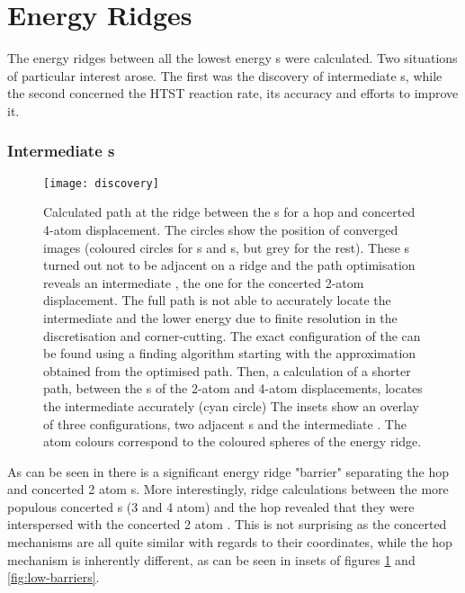 \section{Energy Ridges}
\label{al-energy-ridges}

The energy ridges between all the lowest energy s were calculated.
Two situations of particular interest arose.
The first was the discovery of intermediate s, while the second concerned the HTST reaction rate, its accuracy and efforts to improve it.

\subsubsection{Intermediate s}
\begin{figure}[hp]
\begin{center}
\texttt{[image: discovery]}
    \parbox{0.85\linewidth}{
\caption{
Calculated path at the ridge between the s for a hop and concerted 4-atom displacement.
The circles show the position of converged images (coloured circles for s and s, but grey for the rest). 
These s turned out not to be adjacent on a ridge and the path optimisation reveals an intermediate , the one for the concerted 2-atom displacement.
The full path is not able to accurately locate the intermediate  and the lower energy  due to finite resolution in the discretisation and corner-cutting.
The exact configuration of the  can be found using a  finding algorithm starting with the approximation obtained from the optimised path.
Then, a calculation of a shorter path, between the s of the 2-atom  and 4-atom displacements, locates the intermediate  accurately (cyan circle)
The insets show an overlay of three configurations, two adjacent s and the intermediate .
The atom colours correspond to the coloured spheres of the energy ridge.
}
\label{fig:discovery}
}
\end{center}
\end{figure}

As can be seen in  there is a significant energy ridge "barrier" separating the hop and concerted 2 atom s.
More interestingly, ridge calculations between the more populous concerted s (3 and 4 atom) and the hop revealed that they were interspersed with the concerted 2 atom .
This is not surprising as the concerted mechanisms are all quite similar with regards to their coordinates, while the hop mechanism is inherently different, as can be seen in insets of figures \ref{fig:discovery} and \ref{fig:low-barriers}.

